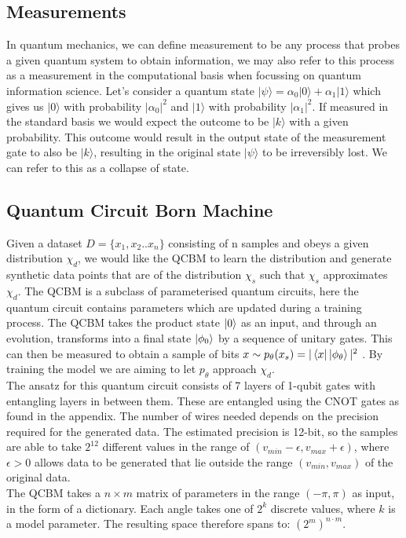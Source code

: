 \documentclass[12pt]{article}
\numberwithin{equation}{section}
\begin{document}
\subsection{Measurements}
In quantum mechanics, we can define measurement to be any process that probes a 
given quantum system to obtain information, we may also refer to this process as 
a measurement in the computational basis when focussing on quantum information 
science. Let's consider a quantum state 
$|\psi \rangle = \alpha_0|0\rangle+\alpha_1|1\rangle$ which gives us $|0\rangle$
with probability $|\alpha_0|^2$ and $|1\rangle$ with probability $|\alpha_1|^2$. 
If measured in the standard basis we would expect the outcome to be $|k\rangle$
with a given probability. This outcome would result in the output 
state of the measurement gate to also be $|k\rangle$, resulting in the original 
state $|\psi\rangle$ to be irreversibly lost. We can refer to this as a collapse of state. 


\subsection{Quantum Circuit Born Machine}
Given a dataset $D = \{x_1, x_2.. x_n\}$ consisting of n samples and obeys a 
given distribution $\chi_d$, we would like the QCBM to learn the distribution 
and generate synthetic data points that are of the distribution $\chi_s$ such that
$\chi_s$ approximates $\chi_d$.
The QCBM is a subclass of parameterised quantum circuits, 
here the quantum circuit contains parameters which are updated during a training 
process. The QCBM takes the product state $\ket{0}$ as an input, and through an 
evolution, transforms into a final state $\ket{\phi_0}$ by a sequence of unitary 
gates. This can then be measured to obtain a sample of bits 
$x \sim p_\theta (x_s)=|\bra{x}\ket{\phi_\theta}|^2$ . By training the model we 
are aiming to let $p_\theta$ approach $\chi_d$. 
\\
The ansatz for this quantum circuit consists of 7 layers
of 1-qubit gates with entangling layers in between them. These are 
entangled using the CNOT gates as found in the appendix. The number of wires 
needed depends on the precision required for the generated data. The estimated
precision is 12-bit, so the samples are able to take $2^{12}$ different values in 
the range of $ (v_{min} - \epsilon, v_{max} + \epsilon )$, where $\epsilon > 0 $
allows data to be generated that lie outside the range $(v_{min},v_{max})$ of the 
original data.
\\
The QCBM takes a $n \times m$ matrix of parameters in the range $(-\pi, \pi)$ as 
input, in the form of a dictionary. Each angle takes one of $2^k$ discrete values, 
where $k$ is a model parameter. The resulting space therefore spans to: 
$(2^m)^{n\cdot m}$.
\clearpage
\end{document}
